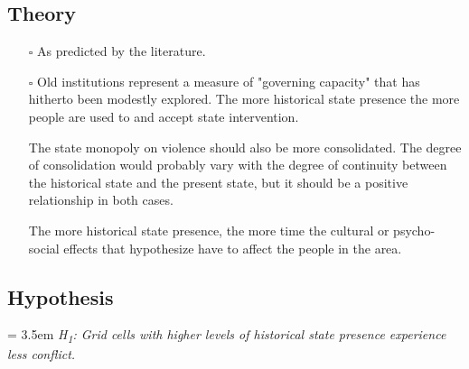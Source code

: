 \documentclass[12pt]{article}
\begin{document}
\subsection{Theory}
\begin{itemize}
	\item[$\square$] As predicted by the literature.
	\item[$\square$] Old institutions represent a measure of "governing
		capacity" that has hitherto been modestly explored. The more
		historical state presence the more people are used to and accept
		state intervention. 

		The state monopoly on violence should also be more consolidated.
		The degree of consolidation would probably vary with the degree
		of continuity between the historical state and the present
		state, but it should be a positive relationship in both cases. 

		The more historical state presence, the more time the cultural or
		psycho-social effects that \citet{Pinker2012} hypothesize have
		to affect the people in the area.
\end{itemize}

\subsection{Hypothesis}
	\bigskip
	\hangindent = 3.5em
	\textit{H\textsubscript{1}: Grid cells with higher levels of historical
		state presence experience less conflict.
		}
	\bigskip 
\end{document}
